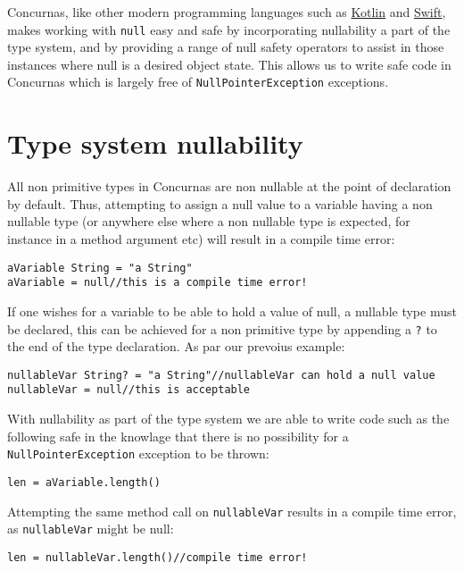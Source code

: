 \documentclass[conc-doc]{subfiles}
\begin{document}
Concurnas, like other modern programming languages such as \href{https://kotlinlang.org/}{Kotlin} and \href{https://developer.apple.com/swift/}{Swift}, makes working with \lstinline{null} easy and safe by incorporating nullability a part of the type system, and by providing a range of null safety operators to assist in those instances where null is a desired object state. This allows us to write safe code in Concurnas which is largely free of \lstinline{NullPointerException} exceptions.

\section{Type system nullability}
All non primitive types in Concurnas are non nullable at the point of declaration by default. Thus, attempting to assign a null value to a variable having a non nullable type (or anywhere else where a non nullable type is expected, for instance in a method argument etc) will result in a compile time error:

\begin{lstlisting}
aVariable String = "a String"
aVariable = null//this is a compile time error!
\end{lstlisting}

If one wishes for a variable to be able to hold a value of null, a nullable type must be declared, this can be achieved for a non primitive type by appending a \lstinline{?} to the end of the type declaration. As par our prevoius example:

\begin{lstlisting}
nullableVar String? = "a String"//nullableVar can hold a null value
nullableVar = null//this is acceptable
\end{lstlisting}

With nullability as part of the type system we are able to write code such as the following safe in the knowlage that there is no possibility for a \lstinline{NullPointerException} exception to be thrown:

\begin{lstlisting}
len = aVariable.length()
\end{lstlisting}

Attempting the same method call on \lstinline{nullableVar} results in a compile time error, as \lstinline{nullableVar} might be null:

\begin{lstlisting}
len = nullableVar.length()//compile time error!
\end{lstlisting}
\end{document}
